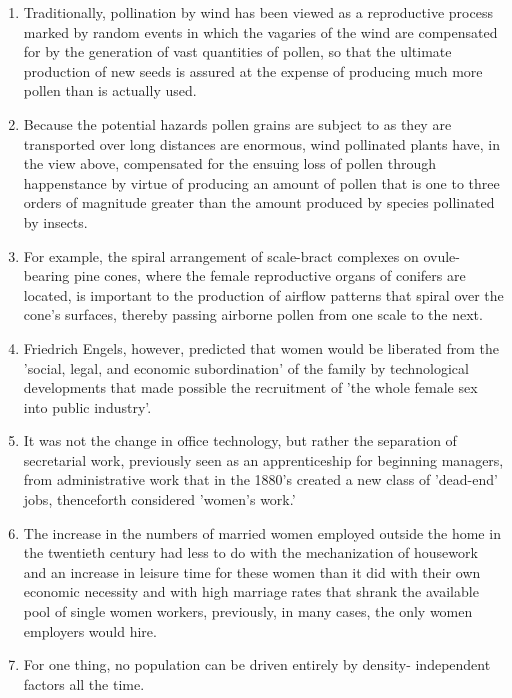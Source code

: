 \begin{enumerate}
\item Traditionally, pollination by wind has been viewed as a reproductive
process marked by random events in which the vagaries of the wind are compensated for by the generation of vast quantities of pollen, so that the ultimate production of new seeds is assured at the expense of producing much more pollen than is actually used.

\item Because the potential hazards pollen grains are subject to as they are transported over long distances are enormous, wind pollinated plants have, in the view above, compensated for the  ensuing loss of pollen through happenstance by virtue of producing an amount of pollen that is one to three orders of magnitude greater than the amount produced by species pollinated by insects. 

\item For example, the spiral arrangement of scale-bract complexes on
ovule-bearing pine cones, where the female reproductive organs of conifers are located, is important to the production of airflow patterns that spiral over the cone's surfaces, thereby passing airborne pollen from one scale to the next. 

\item Friedrich Engels, however, predicted that women would be liberated from the 'social, legal, and economic subordination' of the family by technological developments that made possible the recruitment of 'the whole female sex into public industry'.

\item It was not the change in office technology, but rather the separation of secretarial work,   previously seen as an apprenticeship for beginning managers, from administrative work that in the 1880's created a new class of 'dead-end' jobs, thenceforth considered 'women's work.' 

\item The increase in the numbers of married women employed outside the home in the twentieth  century had less to do with the mechanization of housework and an increase in leisure time for these women than it did with their own economic necessity and with high marriage rates that shrank the available pool of single women workers, previously, in many cases, the only women employers would hire.

\item For one thing, no population can be driven entirely by density-
independent factors all the time.


\end{enumerate}
